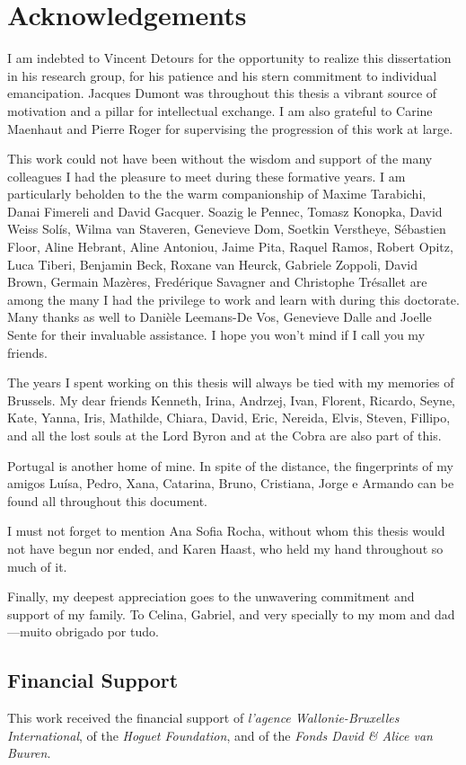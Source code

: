 \chapter*{Acknowledgements}
\thispagestyle{empty}

I am indebted to Vincent Detours for the opportunity to realize this
dissertation in his research group, for his patience and his stern commitment to
individual emancipation.  Jacques Dumont was throughout this thesis a vibrant
source of motivation and a pillar for intellectual exchange.  I am also grateful
to Carine Maenhaut and Pierre Roger for supervising the progression of this work
at large.

This work could not have been without the wisdom and support of the many
colleagues I had the pleasure to meet during these formative years.  I am
particularly beholden to the the warm companionship of Maxime Tarabichi, Danai
Fimereli and David Gacquer.  Soazig le Pennec, Tomasz Konopka, David Weiss
Solís, Wilma van Staveren, Genevieve Dom, Soetkin Verstheye, Sébastien Floor,
Aline Hebrant, Aline Antoniou, Jaime Pita, Raquel Ramos, Robert Opitz, Luca
Tiberi, Benjamin Beck, Roxane van Heurck, Gabriele Zoppoli, David Brown, Germain
Mazères, Fredérique Savagner and Christophe Trésallet are among the many I had
the privilege to work and learn with during this doctorate.  Many thanks as well
to Danièle Leemans-De Vos, Genevieve Dalle and Joelle Sente for their invaluable
assistance.  I hope you won't mind if I call you my friends.

The years I spent working on this thesis will always be tied with my memories of
Brussels.  My dear friends Kenneth, Irina, Andrzej, Ivan, Florent, Ricardo,
Seyne, Kate, Yanna, Iris, Mathilde, Chiara, David, Eric, Nereida, Elvis, Steven,
Fillipo, and all the lost souls at the Lord Byron and at the Cobra are also part
of this.

Portugal is another home of mine.  In spite of the distance, the fingerprints of
my amigos Luísa, Pedro, Xana, Catarina, Bruno, Cristiana, Jorge e Armando can
be found all throughout this document.

I must not forget to mention Ana Sofia Rocha, without whom this thesis would not
have begun nor ended, and Karen Haast, who held my hand throughout so much of
it.

Finally, my deepest appreciation goes to the unwavering commitment and support
of my family.  To Celina, Gabriel, and very specially to my mom and dad---muito
obrigado por tudo.

\section*{Financial Support}
\label{sec:financial-support}
This work received the financial support of \emph{l'agence Wallonie-Bruxelles
  International}, of the \emph{Hoguet Foundation}, and of the \emph{Fonds David
  \& Alice van Buuren}.

\clearpage